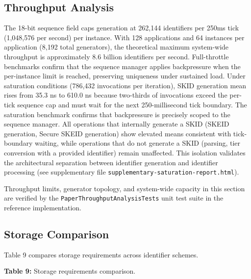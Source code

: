 \documentclass[fleqn,10pt]{wlpeerj}
\begin{document}
\subsection{Throughput Analysis}\label{throughput-analysis}

The 18-bit sequence field caps generation at 262,144 identifiers per
250ms tick (1,048,576 per second) per instance. With 128 applications
and 64 instances per application (8,192 total generators), the
theoretical maximum system-wide throughput is approximately 8.6 billion
identifiers per second. Full-throttle benchmarks confirm that the
sequence manager applies backpressure when the per-instance limit is
reached, preserving uniqueness under sustained load. Under saturation
conditions (786,432 invocations per iteration), SKID generation mean
rises from 35.3 ns to 610.0 ns because two-thirds of invocations exceed
the per-tick sequence cap and must wait for the next 250-millisecond
tick boundary. The saturation benchmark confirms that backpressure is
precisely scoped to the sequence manager. All operations that internally
generate a SKID (SKEID generation, Secure SKEID generation) show
elevated means consistent with tick-boundary waiting, while operations
that do not generate a SKID (parsing, tier conversion with a provided
identifier) remain unaffected. This isolation validates the
architectural separation between identifier generation and identifier
processing (see supplementary file
\texttt{supplementary-saturation-report.html}).

Throughput limits, generator topology, and system-wide capacity in this
section are verified by the \texttt{PaperThroughputAnalysisTests} unit
test suite in the reference implementation.

\subsection{Storage Comparison}\label{storage-comparison}

Table 9 compares storage requirements across identifier schemes.

\textbf{Table 9:} Storage requirements comparison.
\end{document}
